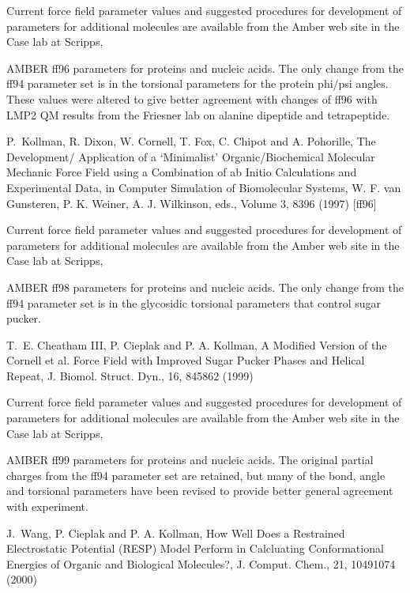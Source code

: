 \documentclass[letterpaper,11pt,english]{sphinxmanual}
\begin{document}
Current force field parameter values and suggested procedures for development of parameters for additional molecules are available from the Amber web site in the Case lab at Scripps, 


AMBER ff96 parameters for proteins and nucleic acids. The only change from the ff94 parameter set is in the torsional parameters for the protein phi/psi angles. These values were altered to give better agreement with  changes of ff96 with LMP2 QM results from the Friesner lab on alanine dipeptide and tetrapeptide.

P. Kollman, R. Dixon, W. Cornell, T. Fox, C. Chipot and A. Pohorille, The Development/ Application of a ‘Minimalist’ Organic/Biochemical Molecular Mechanic Force Field using a Combination of ab Initio Calculations and Experimental Data, in Computer Simulation of Biomolecular Systems, W. F. van Gunsteren, P. K. Weiner, A. J. Wilkinson, eds., Volume 3, 83\sphinxhyphen{}96 (1997)  {[}ff96{]}

Current force field parameter values and suggested procedures for development of parameters for additional molecules are available from the Amber web site in the Case lab at Scripps, 


AMBER ff98 parameters for proteins and nucleic acids. The only change from the ff94 parameter set is in the glycosidic torsional parameters that control sugar pucker.

T. E. Cheatham III, P. Cieplak and P. A. Kollman, A Modified Version of the Cornell et al. Force Field with Improved Sugar Pucker Phases and Helical Repeat, J. Biomol. Struct. Dyn., 16, 845\sphinxhyphen{}862 (1999)

Current force field parameter values and suggested procedures for development of parameters for additional molecules are available from the Amber web site in the Case lab at Scripps, 


AMBER ff99 parameters for proteins and nucleic acids. The original partial charges from the ff94 parameter set are retained, but many of the bond, angle and torsional parameters have been revised to provide better general agreement with experiment.

J. Wang, P. Cieplak and P. A. Kollman, How Well Does a Restrained Electrostatic Potential (RESP) Model Perform in Calcluating Conformational Energies of Organic and Biological Molecules?, J. Comput. Chem., 21, 1049\sphinxhyphen{}1074 (2000)
\end{document}
